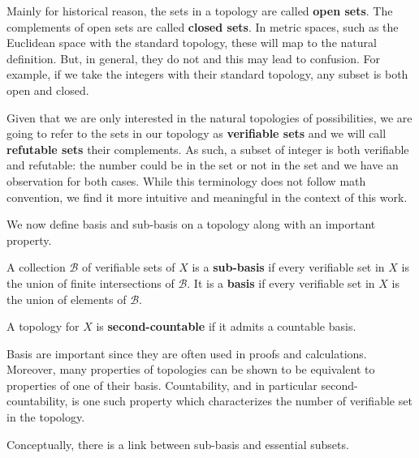 \documentclass[11pt,letterpaper,fleqn]{memoir} %
\begin{document}
Mainly for historical reason, the sets in a topology are called \textbf{open sets}. The complements of open sets are called \textbf{closed sets}. In metric spaces, such as the Euclidean space with the standard topology, these will map to the natural definition. But, in general, they do not and this may lead to confusion. For example, if we take the integers with their standard topology, any subset is both open and closed.

Given that we are only interested in the natural topologies of possibilities, we are going to refer to the sets in our topology as \textbf{verifiable sets} and we will call \textbf{refutable sets} their complements. As such, a subset of integer is both verifiable and refutable: the number could be in the set or not in the set and we have an observation for both cases.  While this terminology does not follow math convention, we find it more intuitive and meaningful in the context of this work.

We now define basis and sub-basis on a topology along with an important property.
\begin{mathSection}
\begin{defn}
	A collection $\mathcal{B}$ of verifiable sets of $X$ is a \textbf{sub-basis} if every verifiable set in $X$ is the union of finite intersections of $\mathcal{B}$. It is a \textbf{basis} if every verifiable set in $X$ is the union of elements of $\mathcal{B}$.
\end{defn}
\begin{defn}
	A topology for $X$ is \textbf{second-countable} if it admits a countable basis.
\end{defn}
\end{mathSection}

Basis are important since they are often used in proofs and calculations. Moreover, many properties of topologies can be shown to be equivalent to properties of one of their basis. Countability, and in particular second-countability, is one such property which characterizes the number of verifiable set in the topology.

Conceptually, there is a link between sub-basis and essential subsets.
\end{document}
